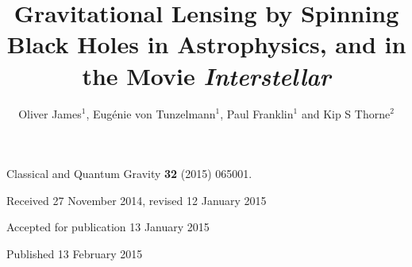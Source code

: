\documentclass[12pt]{iopart}
\begin{document}
\title[Gravitational Lensing by Black Holes in Astrophysics and in {\rm Interstellar}]{Gravitational Lensing by Spinning Black Holes in Astrophysics, and in the Movie \textit{Interstellar}}


\author{Oliver James$^1$,  Eug\'enie von Tunzelmann$^1$, Paul Franklin$^1$ and Kip S Thorne$^2$}

\address{$^1$Double Negative Ltd., 160 Great Portland Street, London W1W 5QA, UK}
\address{$^2$Walter Burke Institute for Theoretical Physics, California Institute of Technology, Pasadena, California 91125, USA}
\vspace{10pt}
\begin{indented}
\item[]Classical and Quantum Gravity {\bf 32} (2015) 065001. 
\item[]Received 27 November 2014, revised 12 January 2015 
\item[]Accepted for publication 13 January 2015
\item[]Published 13 February 2015 
\end{indented}
\end{document}
